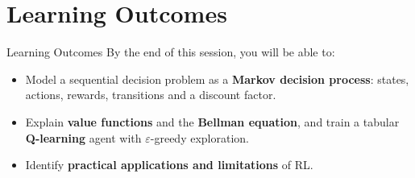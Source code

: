 \section{Learning Outcomes}
\begin{frame}{Learning Outcomes}
    \large
    By the end of this session, you will be able to:
    \vspace{0.5em}
    \begin{itemize}
        \setlength{\itemsep}{1em}
        \item Model a sequential decision problem as a \textbf{Markov decision process}: states, actions, rewards, transitions and a discount factor.
        \item Explain \textbf{value functions} and the \textbf{Bellman equation}, and train a tabular \textbf{Q-learning} agent with $\varepsilon$-greedy exploration.
        \item Identify \textbf{practical applications and limitations} of RL.
    \end{itemize}
\end{frame}
